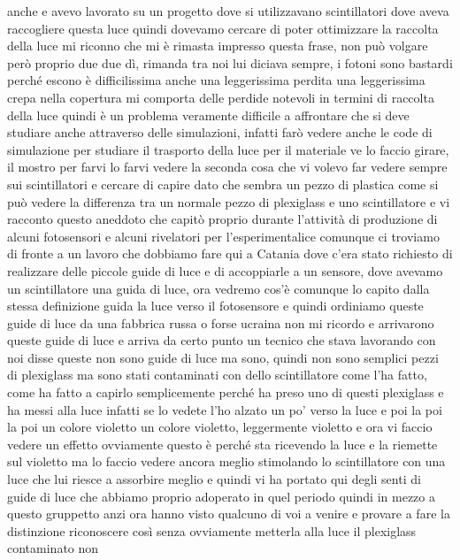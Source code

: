 {anche e avevo lavorato su un progetto dove si utilizzavano scintillatori dove aveva raccogliere questa luce quindi dovevamo cercare di poter ottimizzare la raccolta della luce mi riconno che mi è rimasta impresso questa frase, non può volgare però proprio due due dì, rimanda tra noi lui diciava sempre, i fotoni sono bastardi perché escono è difficilissima anche una leggerissima perdita una leggerissima crepa nella copertura mi comporta delle perdide notevoli in termini di raccolta della luce quindi è un problema veramente difficile a affrontare che si deve studiare anche attraverso delle simulazioni, infatti farò vedere anche le code di simulazione per studiare il trasporto della luce per il materiale ve lo faccio girare, il mostro per farvi lo farvi vedere la seconda cosa che vi volevo far vedere sempre sui scintillatori e cercare di capire dato che sembra un pezzo di plastica come si può vedere la differenza tra un normale pezzo di plexiglass e uno scintillatore e vi racconto questo aneddoto che capitò proprio durante l'attività di produzione di alcuni fotosensori e alcuni rivelatori per l'esperimentalice comunque ci troviamo di fronte a un lavoro che dobbiamo fare qui a Catania dove c'era stato richiesto di realizzare delle piccole guide di luce e di accoppiarle a un sensore, dove avevamo un scintillatore una guida di luce, ora vedremo cos'è comunque lo capito dalla stessa definizione guida la luce verso il fotosensore e quindi ordiniamo queste guide di luce da una fabbrica russa o forse ucraina non mi ricordo e arrivarono queste guide di luce e arriva da certo punto un tecnico che stava lavorando con noi disse queste non sono guide di luce ma sono, quindi non sono semplici pezzi di plexiglass ma sono stati contaminati con dello scintillatore come l'ha fatto, come ha fatto a capirlo semplicemente perché ha preso uno di questi plexiglass e ha messi alla luce infatti se lo vedete l'ho alzato un po' verso la luce e poi la poi la poi un colore violetto un colore violetto, leggermente violetto e ora vi faccio vedere un effetto ovviamente questo è perché sta ricevendo la luce e la riemette sul violetto ma lo faccio vedere ancora meglio stimolando lo scintillatore con una luce che lui riesce a assorbire meglio e quindi vi ha portato qui degli senti di guide di luce che abbiamo proprio adoperato in quel periodo quindi in mezzo a questo gruppetto anzi ora hanno visto qualcuno di voi a venire e provare a fare la distinzione riconoscere così senza ovviamente metterla alla luce il plexiglass contaminato non

}

